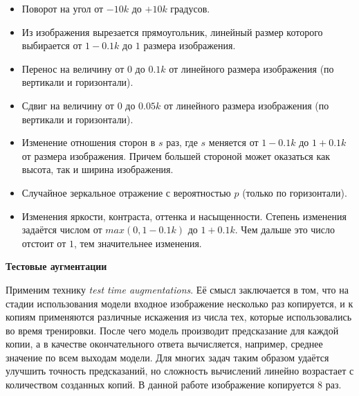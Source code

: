 \begin{itemize}

    \item Поворот на угол от $-10k$ до $+10k$ градусов.

    \item Из изображения вырезается прямоугольник, линейный размер
    которого выбирается от $1 - 0.1k$ до $1$ размера изображения.
    
    \item Перенос на величину от $0$ до $0.1k$ от линейного
    размера изображения (по вертикали и горизонтали).
    
    \item Сдвиг на величину от $0$ до $0.05k$ от линейного
    размера изображения
    (по вертикали и горизонтали).
    
    \item Изменение отношения сторон в $s$ раз, где $s$ меняется
    от $1 - 0.1k$ до $1 + 0.1k$ от размера изображения.
    Причем большей стороной может оказаться как высота,
    так и ширина изображения.
    
    \item Случайное зеркальное отражение с вероятностью $p$
    (только по горизонтали).
    
    \item Изменения яркости, контраста, оттенка и насыщенности.
    Степень изменения задаётся числом от
    $max(0, 1 - 0.1k)$ до $1 + 0.1k$. Чем дальше это число отстоит от
    $1$, тем значительнее изменения.
    
\end{itemize}
    
\vspace{0.5cm}    
\indent
\indent
\textbf{Тестовые аугментации}

\indent
Применим технику \textit{test time augmentations}.
Её смысл заключается в том, что на стадии использования модели
входное изображение
несколько раз копируется, и к копиям применяются различные 
искажения из числа тех, которые использовались во время тренировки.
После чего модель производит предсказание для каждой
копии, а в качестве окончательного ответа вычисляется, например, 
среднее значение по всем выходам модели. Для многих задач таким образом
удаётся улучшить точность предсказаний,
но сложность вычислений линейно возрастает
с количеством созданных копий.
В данной работе изображение копируется 8 раз.


